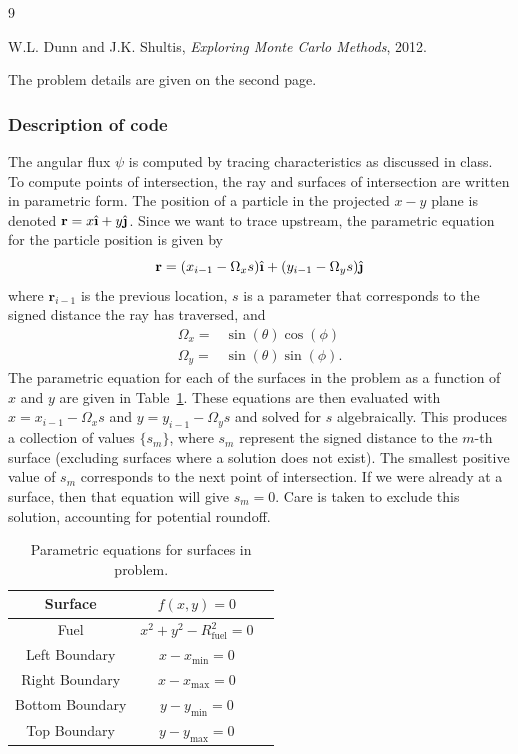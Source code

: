 \documentclass[12pt]{article}
\newcommand{\ihat}{\ensuremath{\hat{\textbf{\i}}}}
\newcommand{\jhat}{\ensuremath{\hat{\textbf{\j}}}}
\newenvironment{problem}[2][Problem]{\begin{trivlist}
\item[\hskip \labelsep {\bfseries #1}\hskip \labelsep {\bfseries #2:}]\hspace{0.3in}\newline\newline}{\end{trivlist}}
\newenvironment{solution}[1][Solution]{\begin{trivlist}
\item[\hskip \labelsep {\bfseries #1} {\hspace{-0.2em}\bfseries:}]\hspace{0.3in}\newline}{\end{trivlist}}
\begin{document}
 \begin{thebibliography}{9}

         W.L. Dunn and J.K. Shultis, \emph{Exploring Monte Carlo Methods}, 2012.


\end{thebibliography}
\clearpage
\begin{problem}{3}
The problem details are given on the second page.
\end{problem}

\begin{solution}

\subsubsection*{Description of code}

The angular flux $\psi$ is computed by tracing characteristics as discussed in class.  To
compute points of intersection, the ray and surfaces of intersection are written in
parametric form. The position of a particle in the projected $x-y$ plane is denoted
$\mathbf{r} = x\ihat +
y\jhat$. Since we want to trace upstream, the parametric equation for the particle
position is given by 
\begin{equation}
    \mathbf{r} = (x_{i-1}-\Omega_xs)\ihat + (y_{i-1} - \Omega_ys)\jhat
\end{equation}
where $\mathbf{r}_{i-1}$ is the previous location, $s$ is a parameter that corresponds
to the signed distance the ray has traversed, and
\begin{align}
    \Omega_x =& \sin(\theta)\cos(\phi) \\
    \Omega_y =& \sin(\theta)\sin(\phi).
\end{align}
The parametric equation for each of the surfaces in the problem as a function of $x$ and
$y$ are given in Table~\ref{surfs}.  These equations are then evaluated with
$x=x_{i-1}-\Omega_xs$ and $y=y_{i-1}-\Omega_ys$ and solved for $s$ algebraically.
This produces a collection of values $\{s_m\}$, where $s_m$ represent the signed
distance to the $m$-th surface (excluding surfaces where a solution does not exist).
The smallest positive value of $s_m$ corresponds to the next point of intersection.  If we were already at a surface, then
that equation will give $s_m=0$.  Care is taken to exclude this solution, accounting
for potential roundoff.
\begin{table}[h]
    \centering
    \caption{Parametric equations for surfaces in problem.\label{surfs}}
    \begin{tabular}{|c|c|c|} \hline
    Surface & $f(x,y)=0$ \\ \hline
    Fuel    & $x^2 + y^2 - R_{\text{fuel}}^2=0$ \\
    Left Boundary & $x - x_{\min}=0$ \\
    Right Boundary & $x - x_{\max}=0$ \\ 
    Bottom Boundary & $y - y_{\min}=0$ \\
        Top Boundary & $y - y_{\max}=0$ \\ \hline
    \end{tabular}
\end{table}


\end{solution}
\end{document}
